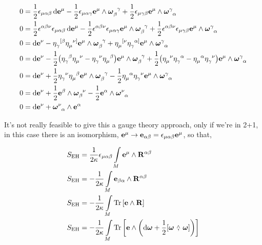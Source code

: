 \begin{align*}
    0&=\frac{1}{2}\epsilon_{\mu\alpha\beta}\dd{\vb e^\mu}-\frac{1}{2}\epsilon_{\mu\alpha\gamma}\vb e^\mu\wedge\tensor{\boldsymbol\omega}{_\beta^\gamma}+\frac{1}{2}\epsilon_{\mu\gamma\beta}\vb e^\mu\wedge\tensor{\boldsymbol\omega}{^\gamma_\alpha}\\
    0&=\frac{1}{2}\epsilon^{\alpha\beta\nu}\epsilon_{\mu\alpha\beta}\dd{\vb e^\mu}-\frac{1}{2}\epsilon^{\alpha\beta\nu}\epsilon_{\mu\alpha\gamma}\vb e^\mu\wedge\tensor{\boldsymbol\omega}{_\beta^\gamma}+\frac{1}{2}\epsilon^{\alpha\beta\nu}\epsilon_{\mu\gamma\beta}\vb e^\mu\wedge\tensor{\boldsymbol\omega}{^\gamma_\alpha}\\
    0&=\dd{\vb e^\nu}-\tensor{\eta}{_\gamma^{[\beta}}\tensor{\eta}{_\mu^{\nu]}}\vb e^\mu\wedge\tensor{\boldsymbol\omega}{_\beta^\gamma}+\tensor{\eta}{_\mu^{[\nu}}\tensor{\eta}{_\gamma^{\alpha]}}\vb e^\mu\wedge\tensor{\boldsymbol\omega}{^\gamma_\alpha}\\
    0&=\dd{\vb e^\nu}-\frac{1}{2}\qty(\tensor{\eta}{_\gamma^{\beta}}\tensor{\eta}{_\mu^{\nu}}-\tensor{\eta}{_\gamma^{\nu}}\tensor{\eta}{_\mu^{\beta}})\vb e^\mu\wedge\tensor{\boldsymbol\omega}{_\beta^\gamma}+\frac{1}{2}\qty(\tensor{\eta}{_\mu^{\nu}}\tensor{\eta}{_\gamma^{\alpha}}-\tensor{\eta}{_\mu^{\alpha}}\tensor{\eta}{_\gamma^{\nu}})\vb e^\mu\wedge\tensor{\boldsymbol\omega}{^\gamma_\alpha}\\
    0&=\dd{\vb e^\nu}+\frac{1}{2}\tensor{\eta}{_\gamma^{\nu}}\tensor{\eta}{_\mu^{\beta}}\vb e^\mu\wedge\tensor{\boldsymbol\omega}{_\beta^\gamma}-\frac{1}{2}\tensor{\eta}{_\mu^{\alpha}}\tensor{\eta}{_\gamma^{\nu}}\vb e^\mu\wedge\tensor{\boldsymbol\omega}{^\gamma_\alpha}\\
    0&=\dd{\vb e^\nu}+\frac{1}{2}\vb e^\beta\wedge\tensor{\boldsymbol\omega}{_\beta^\nu}-\frac{1}{2}\vb e^\alpha\wedge\tensor{\boldsymbol\omega}{^\nu_\alpha}\\
    0&=\dd{\vb e^\nu}+\tensor{\boldsymbol\omega}{^\nu_\alpha}\wedge\vb e^\alpha
\end{align*}

It's not really feasible to give this a gauge theory approach, only if we're in 2+1, in this case there is an isomorphism, $\vb e^\mu\rightarrow \vb e_{\alpha\beta}=\epsilon_{\mu\alpha\beta}\vb e^\mu$, so that,

\begin{align*}
    S_{\textnormal{EH}}&=\frac{1}{2\kappa}\epsilon_{\mu\alpha\beta}\int\limits_M\vb e^\mu\wedge \vb R^{\alpha\beta}\\
    S_{\textnormal{EH}}&=-\frac{1}{2\kappa}\int\limits_M\vb e_{\beta\alpha}\wedge \vb R^{\alpha\beta}\\
    S_{\textnormal{EH}}&=-\frac{1}{2\kappa}\int\limits_M\Tr\qty[\vb e\wedge \vb R]\\
    S_{\textnormal{EH}}&=-\frac{1}{2\kappa}\int\limits_M\Tr\qty[\vb e\wedge\qty(\dd{\boldsymbol\omega}+\frac12\wedgecomm{\boldsymbol\omega}{\boldsymbol\omega})]
\end{align*}

